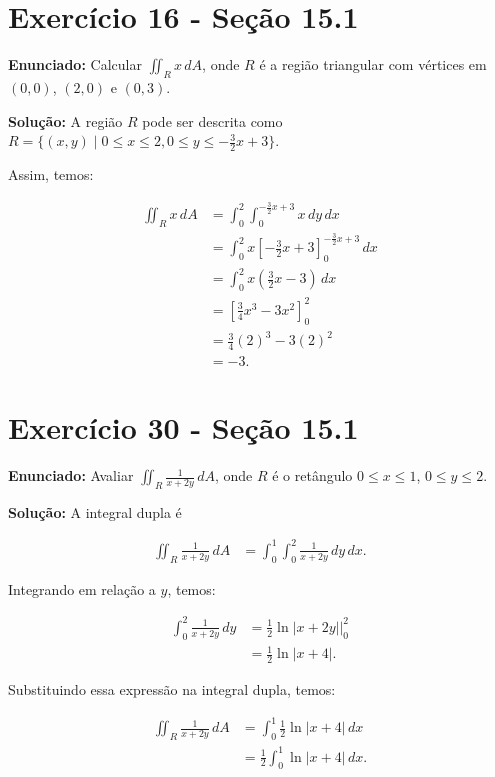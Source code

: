 \documentclass{article}
\begin{document}
\section*{Exercício 16 - Seção 15.1}

\textbf{Enunciado:} Calcular $\iint_R x\,dA$, onde $R$ é a região triangular com vértices em $(0,0)$, $(2,0)$ e $(0,3)$.

\textbf{Solução:} A região $R$ pode ser descrita como $R = \{(x,y) \mid 0 \leq x \leq 2, 0 \leq y \leq -\frac{3}{2}x + 3\}$.

Assim, temos:

\begin{align*}
\iint_R x\,dA &= \int_{0}^{2} \int_{0}^{-\frac{3}{2}x+3} x \,dy\,dx \\
&= \int_{0}^{2} x\left[-\frac{3}{2}x+3\right]_{0}^{-\frac{3}{2}x+3} \,dx \\
&= \int_{0}^{2} x\left(\frac{3}{2}x-3\right) \,dx \\
&= \left[\frac{3}{4}x^3-3x^2\right]_{0}^{2} \\
&= \frac{3}{4}(2)^3-3(2)^2 \\
&= \boxed{-3}.
\end{align*}

\section*{Exercício 30 - Seção 15.1}

\textbf{Enunciado:} Avaliar $\iint_R \frac{1}{x+2y}\,dA$, onde $R$ é o retângulo $0 \leq x \leq 1$, $0 \leq y \leq 2$.

\textbf{Solução:} A integral dupla é

\begin{align*}
\iint_R \frac{1}{x+2y}\,dA &= \int_{0}^{1} \int_{0}^{2} \frac{1}{x+2y} \,dy\,dx.
\end{align*}

Integrando em relação a $y$, temos:

\begin{align*}
\int_{0}^{2} \frac{1}{x+2y} \,dy &= \frac{1}{2} \ln|x+2y| \bigg|_{0}^{2} \\
&= \frac{1}{2} \ln|x+4|.
\end{align*}

Substituindo essa expressão na integral dupla, temos:

\begin{align*}
\iint_R \frac{1}{x+2y}\,dA &= \int_{0}^{1} \frac{1}{2} \ln|x+4| \,dx \\
&= \frac{1}{2} \int_{0}^{1} \ln|x+4| \,dx.
\end{align*}
\end{document}
